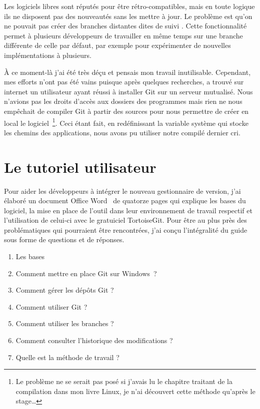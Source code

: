 Les logiciels libres sont réputés pour être rétro-compatibles, mais en
toute logique ils ne disposent pas des nouveautés sans les mettre à jour.
Le problème est qu'on ne pouvait pas créer des branches distantes dites
\og de suivi \fg{}. Cette fonctionnalité permet à plusieurs développeurs
de travailler en même temps sur une branche différente de celle par
défaut, par exemple pour expérimenter de nouvelles implémentations à
plusieurs.

À ce moment-là j'ai été très déçu et pensais mon travail inutilisable.
Cependant, mes efforts n'ont pas été vains puisque  après
quelques recherches, a trouvé sur internet un utilisateur ayant réussi à
installer Git sur un serveur mutualisé.  Nous n'avions pas les droits
d'accès aux dossiers des programmes mais rien ne nous empêchait de
compiler Git à partir des sources pour nous permettre de créer en local
le logiciel\, \footnote{Le problème ne se serait pas posé si j'avais lu
le chapitre traitant de la compilation dans mon livre Linux, je n'ai
découvert cette méthode qu'après le stage\dots}. Ceci étant fait, en
redéfinissant la variable système qui stocke les chemins des
applications, nous avons pu utiliser notre compilé dernier cri.

\section{Le tutoriel utilisateur} %
\label{sec:Le tutoriel utilisateur}

Pour aider les développeurs à intégrer le nouveau gestionnaire de
version, j'ai élaboré un document Office Word~\textregistered{} de
quatorze pages qui explique les bases du logiciel, la mise en place de
l'outil dans leur environnement de travail respectif et l'utilisation de
celui-ci avec le gratuiciel TortoiseGit.  Pour être au plus près des
problématiques qui pourraient être rencontrées, j'ai conçu l'intégralité
du guide sous forme de questions et de réponses.

\begin{enumerate}
  \item Les bases
  \item Comment mettre en place Git sur Windows~\textregistered ?
  \item Comment gérer les dépôts Git ?
  \item Comment utiliser Git ?
  \item Comment utiliser les branches ?
  \item Comment consulter l'historique des modifications ?
  \item Quelle est la méthode de travail ?
\end{enumerate}

